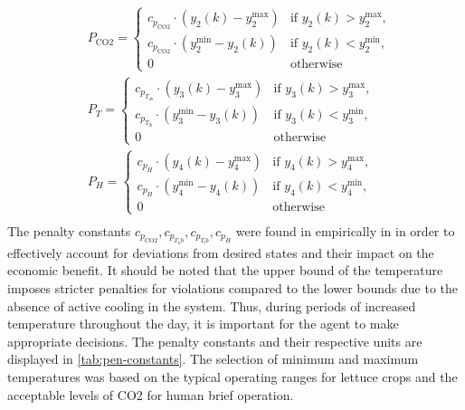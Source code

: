 \begin{equation}
\begin{aligned}
& P_{\text{CO2}} = 
\begin{cases} 
c_{p_{\text{CO2}}} \cdot (y_2(k) - y_2^{\text{max}}) & \text{if } y_2(k) > y_2^{\text{max}} , \\
c_{p_{\text{CO2}}} \cdot (y_2^{\text{min}} - y_2(k)) & \text{if } y_2(k) < y_2^{\text{min}} , \\
0 & \text{otherwise}
\end{cases}
\\
& P_{T} = 
\begin{cases} 
c_{p_{T_{ub}}} \cdot (y_3(k) - y_3^{\text{max}}) & \text{if } y_3(k) > y_3^{\text{max}} , \\
c_{p_{T_{lb}}} \cdot (y_3^{\text{min}} - y_3(k)) & \text{if } y_3(k) < y_3^{\text{min}} , \\
0 & \text{otherwise}
\end{cases}
\\
& P_{H} = 
\begin{cases} 
c_{p_{H}} \cdot (y_4(k) - y_4^{\text{max}}) & \text{if } y_4(k) > y_4^{\text{max}} , \\
c_{p_{H}} \cdot (y_4^{\text{min}} - y_4(k)) & \text{if } y_4(k) < y_4^{\text{min}} , \\
0 & \text{otherwise}
\end{cases}
\\
\end{aligned}
\end{equation}
The penalty constants $c_{p_{\text{CO2}}},c_{p_{T_ub}},c_{p_{T_lb}},c_{p_{H}}$ were found in empirically in \cite{jansenOptimalControlLettuce2023} in order to effectively account for deviations from desired states and their impact on the economic benefit. It should be noted that the upper bound of the temperature  imposes stricter penalties for violations compared to the lower bounds due to the absence of active cooling in the system.  Thus, during periods of increased temperature throughout the day, it is important for the agent to make appropriate decisions. The penalty constants and their respective units are displayed in \autoref{tab:pen-constants}. The selection of minimum and maximum temperatures was based on the typical operating ranges for lettuce crops and the acceptable levels of CO2 for human brief operation.

